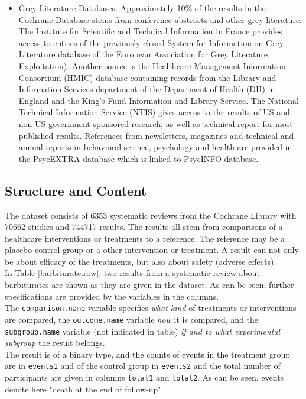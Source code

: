 \documentclass[11pt,a4paper,twoside]{book}\usepackage[]{graphicx}\usepackage[]{color}
\begin{document}
\begin{itemize}
\item Grey Literature Databases. Approximately 10\% of the results in the Cochrane Database stems from conference abstracts and other grey literature. The Institute for Scientific and Technical Information in France provides access to entries of the previously closed System for Information on Grey Literature database of the European Association for Grey Literature Exploitation). Another source is the Healthcare Management Information Consortium (HMIC) database containing records from the Library and Information Services department of the Department of Health (DH) in England and the King's Fund Information and Library Service. The National Technical Information Service (NTIS) gives access to the results of US and non-US government-sponsored research, as well as technical report for most published results. References from newsletters, magazines and technical and annual reports in behavioral science, psychology and health are provided in the PsycEXTRA database which is linked to PsycINFO database.
\end{itemize}


\subsection{Structure and Content}
The dataset consists of 6353 systematic reviews from the Cochrane Library with 70662 studies and 744717 results. The results all stem from comparisons of a healthcare interventions or treatments to a reference. The reference may be a placebo control group or a other intervention or treatment. A result can not only be about efficacy of the treatments, but also about safety (adverse effects).\\
In Table \ref{barbiturate.row}, two results from a systematic review about barbiturates are shown as they are given in the dataset. As can be seen, further specifications are provided by the variables in the columns. \\
The \texttt{comparison.name} variable specifies \textit{what kind} of treatments or interventions are compared, the \texttt{outcome.name} variable \textit{how} it is compared, and the \texttt{subgroup.name} variable (not indicated in table) \textit{if and to what experimental subgroup} the result belongs. \\
The result is of a binary type, and the counts of events in the treatment group are in \texttt{events1} and of the control group in \texttt{events2} and the total number of participants are given in columns \texttt{total1} and \texttt{total2}. As can be seen, events denote here "death at the end of follow-up".
\end{document}
